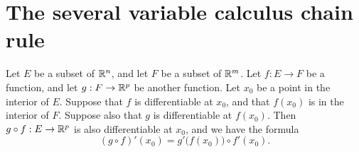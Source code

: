 \section{The several variable calculus chain rule}\label{ii:sec:6.4}

\begin{thm}\label{ii:6.4.1}
  Let \(E\) be a subset of \(\mathbb{R}^n\), and let \(F\) be a subset of \(\mathbb{R}^m\).
  Let \(f : E \to F\) be a function, and let \(g : F \to \mathbb{R}^p\) be another function.
  Let \(x_0\) be a point in the interior of \(E\).
  Suppose that \(f\) is differentiable at \(x_0\), and that \(f(x_0)\) is in the interior of \(F\).
  Suppose also that \(g\) is differentiable at \(f(x_0)\).
  Then \(g \circ f : E \to \mathbb{R}^p\) is also differentiable at \(x_0\), and we have the formula
  \[
    (g \circ f)'(x_0) = g'\big(f(x_0)\big) \circ f'(x_0).
  \]
\end{thm}

